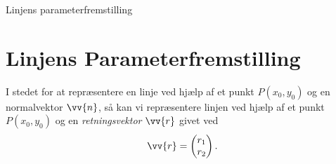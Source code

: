 
\begin{center}
\Huge
Linjens parameterfremstilling
\end{center}

\section*{Linjens Parameterfremstilling}

I stedet for at repræsentere en linje ved hjælp af et punkt $P(x_0,y_0)$ og en normalvektor $\vv{n}$, så kan vi repræsentere linjen ved hjælp af et punkt $P(x_0,y_0)$ og en \textit{retningsvektor} $\vv{r}$ givet ved 
\begin{align*}
	\vv{r} = 	
	\begin{pmatrix}
 		r_1 \\ r_2
	\end{pmatrix}.
\end{align*}

